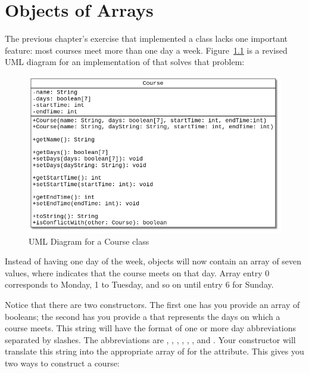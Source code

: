 \chapter{Objects of Arrays}

\begin{exercise}
The previous chapter's exercise that implemented a  class lacks one important feature: most courses meet more than one day a week. Figure~\ref{fig.course2uml} is a revised UML diagram for an implementation of  that solves that problem:

\begin{figure}[!h]
\begin{center}
\includegraphics[scale=0.5]{figs/ch13/course.png}
\caption{UML Diagram for a Course class}
\label{fig.course2uml}
\end{center}
\end{figure}

Instead of having one day of the week,  objects will now contain an array of seven  values, where  indicates that the course meets on that day. Array entry 0 corresponds to Monday, 1 to Tuesday, and so on until entry 6 for Sunday.

Notice that there are two constructors. The first one has you provide an array of booleans; the second has you provide a  that represents the days on which a course meets. This string will have the format of one or more day abbreviations separated by slashes.  The abbreviations are , , , , , , and  .  Your constructor will translate this string into the appropriate array of  for the  attribute. This gives you two ways to construct a course:


\end{exercise}
